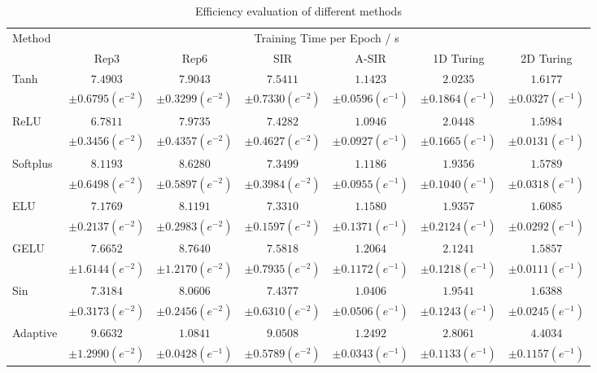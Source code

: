\begin{table*}[!htb]
\centering
\scriptsize
\caption[Efficiency evaluation of different methods] {Efficiency evaluation of different methods}
\label{tab:exp4}
\begin{tabular}{ l cccccc } 
\toprule
\multirow{2}{*}{Method} &  \multicolumn{6}{c}{Training Time per Epoch / s} \\
\cmidrule(l){2-7} 
 & Rep3 & Rep6 &  SIR & A-SIR & 1D Turing & 2D Turing \\
\midrule 
\midrule 
\multirow{2}{*}{Tanh} & $7.4903$ & $7.9043$ & $7.5411$ & $1.1423$ & $2.0235$ & $1.6177$ \\ 
 & $\pm0.6795 (e^{-2})$ & $\pm0.3299 (e^{-2})$ & $\pm0.7330 (e^{-2})$ & $\pm0.0596 (e^{-1})$ & $\pm0.1864 (e^{-1})$ & $\pm0.0327 (e^{-1})$ \\
\multirow{2}{*}{ReLU} & $6.7811$ & $7.9735$ & $7.4282$ & $1.0946$ & $2.0448$ & $1.5984$ \\ 
 & $\pm0.3456 (e^{-2})$ & $\pm0.4357 (e^{-2})$ & $\pm0.4627 (e^{-2})$ & $\pm0.0927 (e^{-1})$ & $\pm0.1665 (e^{-1})$ & $\pm0.0131 (e^{-1})$ \\
\multirow{2}{*}{Softplus} & $8.1193$ & $8.6280$ & $7.3499$ & $1.1186$ & $1.9356$ & $1.5789$ \\ 
 & $\pm0.6498 (e^{-2})$ & $\pm0.5897 (e^{-2})$ & $\pm0.3984 (e^{-2})$ & $\pm0.0955 (e^{-1})$ & $\pm0.1040 (e^{-1})$ & $\pm0.0318 (e^{-1})$ \\
\multirow{2}{*}{ELU} & $7.1769$ & $8.1191$ & $7.3310$ & $1.1580$ & $1.9357$ & $1.6085$ \\ 
 & $\pm0.2137 (e^{-2})$ & $\pm0.2983 (e^{-2})$ & $\pm0.1597 (e^{-2})$ & $\pm0.1371 (e^{-1})$ & $\pm0.2124 (e^{-1})$ & $\pm0.0292 (e^{-1})$ \\
\multirow{2}{*}{GELU} & $7.6652$ & $8.7640$ & $7.5818$ & $1.2064$ & $2.1241$ & $1.5857$ \\ 
 & $\pm1.6144 (e^{-2})$ & $\pm1.2170 (e^{-2})$ & $\pm0.7935 (e^{-2})$ & $\pm0.1172 (e^{-1})$ & $\pm0.1218 (e^{-1})$ & $\pm0.0111 (e^{-1})$ \\
\multirow{2}{*}{Sin} & $7.3184$ & $8.0606$ & $7.4377$ & $1.0406$ & $1.9541$ & $1.6388$ \\ 
 & $\pm0.3173 (e^{-2})$ & $\pm0.2456 (e^{-2})$ & $\pm0.6310 (e^{-2})$ & $\pm0.0506 (e^{-1})$ & $\pm0.1243 (e^{-1})$ & $\pm0.0245 (e^{-1})$ \\
\multirow{2}{*}{Adaptive} & $9.6632$ & $1.0841$ & $9.0508$ & $1.2492$ & $2.8061$ & $4.4034$ \\ 
 & $\pm1.2990 (e^{-2})$ & $\pm0.0428 (e^{-1})$ & $\pm0.5789 (e^{-2})$ & $\pm0.0343 (e^{-1})$ & $\pm0.1133 (e^{-1})$ & $\pm0.1157 (e^{-1})$ \\

\end{tabular}
\end{table*}
